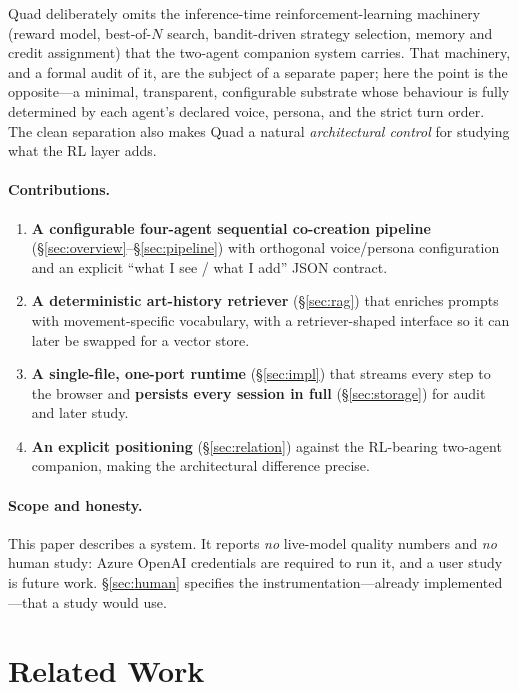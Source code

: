 \documentclass[11pt]{article}
\begin{document}
Quad deliberately omits the inference-time reinforcement-learning machinery
(reward model, best-of-$N$ search, bandit-driven strategy selection, memory and
credit assignment) that the two-agent companion system carries. That machinery,
and a formal audit of it, are the subject of a separate paper; here the point is
the opposite---a minimal, transparent, configurable substrate whose behaviour is
fully determined by each agent's declared voice, persona, and the strict turn
order. The clean separation also makes Quad a natural \emph{architectural control}
for studying what the RL layer adds.

\paragraph{Contributions.}
\begin{enumerate}[leftmargin=1.3em,itemsep=1pt,topsep=2pt]
\item \textbf{A configurable four-agent sequential co-creation pipeline}
      (\S\ref{sec:overview}--\S\ref{sec:pipeline}) with orthogonal voice/persona
      configuration and an explicit ``what I see / what I add'' JSON contract.
\item \textbf{A deterministic art-history retriever} (\S\ref{sec:rag}) that
      enriches prompts with movement-specific vocabulary, with a retriever-shaped
      interface so it can later be swapped for a vector store.
\item \textbf{A single-file, one-port runtime} (\S\ref{sec:impl}) that streams
      every step to the browser and \textbf{persists every session in full}
      (\S\ref{sec:storage}) for audit and later study.
\item \textbf{An explicit positioning} (\S\ref{sec:relation}) against the
      RL-bearing two-agent companion, making the architectural difference precise.
\end{enumerate}

\paragraph{Scope and honesty.}
This paper describes a system. It reports \emph{no} live-model quality numbers and
\emph{no} human study: Azure OpenAI credentials are required to run it, and a user
study is future work. \S\ref{sec:human} specifies the instrumentation---already
implemented---that a study would use.

\section{Related Work}
\end{document}

